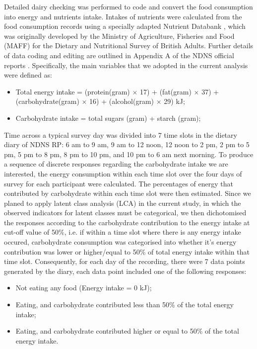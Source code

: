 Detailed dairy checking was performed to code and convert the food consumption into energy and nutrients intake. Intakes of nutrients were calculated from the food consumption records using a specially adapted Nutrient Databank \parencite{smithers1993maff}, which was originally developed by the Ministry of Agriculture, Fisheries and Food (MAFF) for the Dietary and Nutritional Survey of British Adults. Further details of data
coding and editing are outlined in Appendix A of the NDNS official reports \parencite{NDNSofficial}. Specifically, the main variables that we adopted in the current analysis were defined as: 

\begin{itemize}
	\item Total energy intake = (protein(gram) $\times$ 17) + (fat(gram) $\times$ 37) + (carbohydrate(gram) $\times$ 16) + (alcohol(gram) $\times$ 29)  kJ;
	\item Carbohydrate intake = total sugars (gram) + starch (gram); 
\end{itemize}

Time across a typical survey day was divided into 7 time slots in the dietary diary of NDNS RP: 6 am to 9 am, 9 am to 12 noon, 12 noon to 2 pm, 2 pm to 5 pm, 5 pm to 8 pm, 8 pm to 10 pm, and 10 pm to 6 am next morning. To produce a sequence of discrete responses regarding the carbohydrate intake we are interested, the energy consumption within each time slot over the four days of survey for each participant were calculated. The percentages of energy that contributed by carbohydrate within each time slot were then estimated. Since we planed to apply latent class analysis (LCA) in the current study, in which the observed indicators for latent classes must be categorical, we then dichotomised the responses according to the carbohydrate contribution to the energy intake at cut-off value of 50\%, i.e. if within a time slot where there is any energy intake occured, carbohydrate consumption was categorised into whether it's energy contribution was lower or higher/equal to 50\% of total energy intake within that time slot. Consequently, for each day of the recording, there were 7 data points generated by the diary, each data point included one of the following responses:

\begin{itemize}
	\item Not eating any food (Energy intake = 0 kJ); 
	\item Eating, and carbohydrate contributed less than 50\% of the total energy intake;
	\item Eating, and carbohydrate contributed higher or equal to 50\% of the total energy intake.
\end{itemize}
\vspace{-0.5cm}


